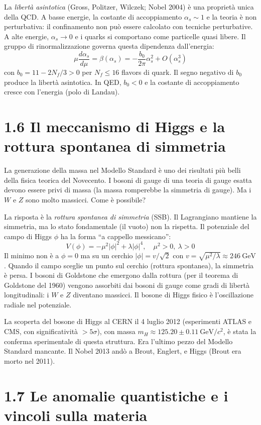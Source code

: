 \documentclass[11.5pt,a4paper,openany]{book}
\theoremstyle{remark}
\begin{document}
La \textit{libertà asintotica} (Gross, Politzer, Wilczek; Nobel 2004) è una proprietà unica della QCD. A basse energie, la costante di accoppiamento $\alpha_s \sim 1$ e la teoria è non perturbativa: il confinamento non può essere calcolato con tecniche perturbative. A alte energie, $\alpha_s \to 0$ e i quarks si comportano come particelle quasi libere. Il gruppo di rinormalizzazione governa questa dipendenza dall'energia:
\[
\mu \frac{d\alpha_s}{d\mu} = \beta(\alpha_s) = -\frac{b_0}{2\pi}\alpha_s^2 + O(\alpha_s^3)
\]
con $b_0 = 11 - 2N_f/3 > 0$ per $N_f \leq 16$ flavors di quark. Il segno negativo di $b_0$ produce la libertà asintotica. In QED, $b_0 < 0$ e la costante di accoppiamento cresce con l'energia (polo di Landau).

\section{1.6 Il meccanismo di Higgs e la rottura spontanea di simmetria}

La generazione della massa nel Modello Standard è uno dei risultati più belli della fisica teorica del Novecento. I bosoni di gauge di una teoria di gauge esatta devono essere privi di massa (la massa romperebbe la simmetria di gauge). Ma i $W$ e $Z$ sono molto massicci. Come è possibile?

La risposta è la \textit{rottura spontanea di simmetria} (SSB). Il Lagrangiano mantiene la simmetria, ma lo stato fondamentale (il vuoto) non la rispetta. Il potenziale del campo di Higgs $\phi$ ha la forma ``a cappello messicano'':
\[
V(\phi) = -\mu^2|\phi|^2 + \lambda|\phi|^4, \quad \mu^2 > 0,\ \lambda > 0
\]
Il minimo non è a $\phi = 0$ ma su un cerchio $|\phi| = v/\sqrt{2}$ con $v = \sqrt{\mu^2/\lambda} \approx 246\ \text{GeV}$. Quando il campo sceglie un punto sul cerchio (rottura spontanea), la simmetria è persa. I bosoni di Goldstone che emergono dalla rottura (per il teorema di Goldstone del 1960) vengono assorbiti dai bosoni di gauge come gradi di libertà longitudinali: i $W$ e $Z$ diventano massicci. Il bosone di Higgs fisico è l'oscillazione radiale nel potenziale.

La scoperta del bosone di Higgs al CERN il 4 luglio 2012 (esperimenti ATLAS e CMS, con significatività $> 5\sigma$), con massa $m_H \approx 125.20 \pm 0.11\ \text{GeV}/c^2$, è stata la conferma sperimentale di questa struttura. Era l'ultimo pezzo del Modello Standard mancante. Il Nobel 2013 andò a Brout, Englert, e Higgs (Brout era morto nel 2011).

\section{1.7 Le anomalie quantistiche e i vincoli sulla materia}
\end{document}
